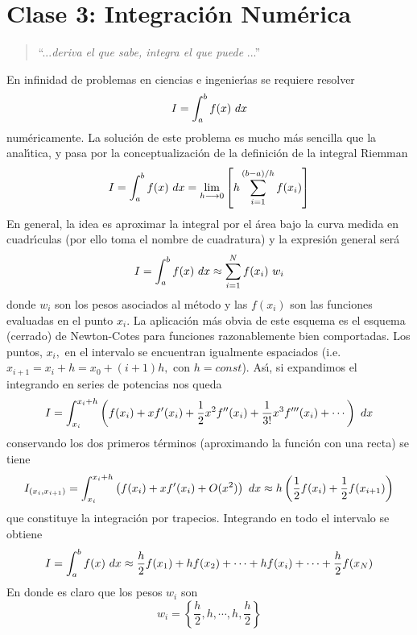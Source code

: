 \documentclass[spanish,titlepage,11pt]{article}
\begin{document}
\section{\textbf{Clase 3: }Integraci\'{o}n Num\'{e}rica}

\begin{quotation}
``...\textit{deriva el que sabe, integra el que puede} ...''
\end{quotation}

En infinidad de problemas en ciencias e ingenier\'{\i}as se requiere resolver
\begin{equation}
I=\int_{a}^{b}f(x)\ {\normalsize d}x
\end{equation}
num\'{e}ricamente. La soluci\'{o}n de este problema es mucho m\'{a}s sencilla
que la anal\'{\i}tica, y pasa por la conceptualizaci\'{o}n de la
definici\'{o}n de la integral Riemman
\begin{equation}
I=\int_{a}^{b}f(x)\ {\normalsize d}x=\lim_{h\longrightarrow0}\left[
h\sum_{i=1}^{\left(  b-a\right)  /h}f(x_{i})\right]
\end{equation}
En general, la idea es aproximar la integral por el \'{a}rea bajo la curva
medida en cuadr\'{\i}culas (por ello toma el nombre de cuadratura) y la
expresi\'{o}n general ser\'{a}
\begin{equation}
I=\int_{a}^{b}f(x)\ {\normalsize d}x\approx\sum_{i=1}^{N}f(x_{i})\ w_{i}
\label{intaprox}%
\end{equation}
donde $w_{i}$ son los pesos asociados al m\'{e}todo y las $f(x_{i})$ son las
funciones evaluadas en el punto $x_{i}.$ La aplicaci\'{o}n m\'{a}s obvia de
este esquema es el esquema (cerrado) de Newton-Cotes para funciones
razonablemente bien comportadas. Los puntos, $x_{i},$ en el intervalo se
encuentran igualmente espaciados (i.e. $x_{i+1}=x_{i}+h=x_{0}+\left(
i+1\right)  h,$ con $h=const$). As\'{\i}, si expandimos el integrando en
series de potencias nos queda
\begin{equation}
I=\int_{x_{i}}^{x_{i}+h}\left(  f(x_{i})+xf^{\prime}(x_{i})+\dfrac{1}{2}%
x^{2}f^{\prime\prime}(x_{i})+\dfrac{1}{3!}x^{3}f^{\prime\prime\prime}%
(x_{i})+\cdots\right)  \ {\normalsize d}x
\end{equation}
conservando los dos primeros t\'{e}rminos (aproximando la funci\'{o}n con una
recta) se tiene
\begin{equation}
I_{\left(  x_{i},x_{i+1}\right)  }=\int_{x_{i}}^{x_{i}+h}\left(
f(x_{i})+xf^{\prime}(x_{i})+O(x^{2})\right)  \ {\normalsize d}x\approx
h\left(  \dfrac{1}{2}f(x_{i})+\dfrac{1}{2}f(x_{i+1})\right)
\end{equation}
que constituye la integraci\'{o}n por trapecios. Integrando en todo el
intervalo se obtiene
\begin{equation}
I=\int_{a}^{b}f(x)\ {\normalsize d}x\approx\dfrac{h}{2}f(x_{1})+hf(x_{2}%
)+\cdots+hf(x_{i})+\cdots+\dfrac{h}{2}f(x_{N})
\end{equation}
En donde es claro que los pesos $w_{i}$ son
\begin{equation}
w_{i}=\left\{  \dfrac{h}{2},h,\cdots,h,\dfrac{h}{2}\right\}
\end{equation}
\end{document}
